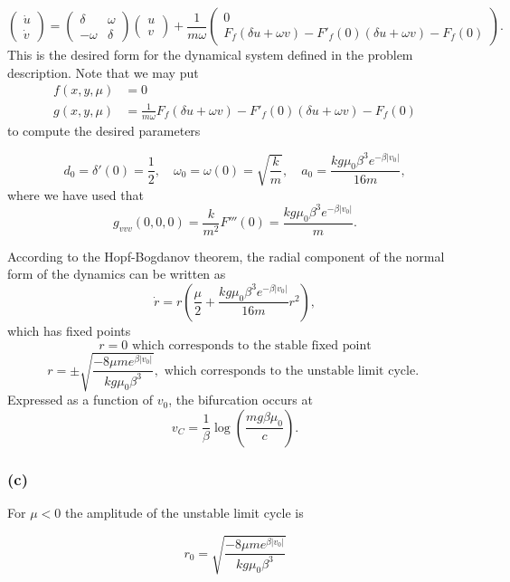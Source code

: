 \documentclass[twoside,10pt,a4paper]{article}
\begin{document}
 \begin{equation}
 \begin{pmatrix} \dot{u} \\ \dot{v} \end{pmatrix} = \begin{pmatrix} \delta  & \omega  \\  -\omega & \delta \end{pmatrix}\begin{pmatrix} u \\ v  \end{pmatrix} + \frac{1}{m\omega}\begin{pmatrix} 0  \\ F_f(\delta u + \omega v) - F'_f(0)(\delta u + \omega v) - F_f (0)\end{pmatrix}.
 \end{equation}
 This is the desired form for the dynamical system defined in the problem description. Note that we may put
 \begin{align*}
 f(x,y,\mu) &=0 \\
 g(x,y,\mu) &= \frac{1}{m\omega} F_f(\delta u + \omega v) - F'_f(0)(\delta u + \omega v) - F_f (0)
 \end{align*}
 to compute the desired parameters
 
$$
d_0 = \delta'(0)=\frac{1}{2}, \quad \omega_0 = \omega(0)= \sqrt{\frac{k}{m}}, \quad a_0 = \frac{kg\mu_0 \beta^3 e^{-\beta |v_0|}}{16m},
$$
where we have used that 
$$ 
g_{vvv}(0,0,0) = \frac{k}{m^2}F'''(0)= \frac{kg\mu_0 \beta^3 e^{-\beta |v_0|}}{m}.
$$

According to the Hopf-Bogdanov theorem, the radial component of the normal form of the dynamics can be written as
\begin{equation}
\boxed{\dot{r}=r\left( \frac{\mu}{2}+ \frac{kg\mu_0 \beta^3 e^{-\beta |v_0|}}{16m}r^2\right)},
\end{equation}
which has fixed points 
$$
r=0 \text{ which corresponds to the stable fixed point}
$$
$$
r = \pm \sqrt{\frac{-8\mu m e^{\beta |v_0|}}{kg\mu_0 \beta^3}}, \text{ which corresponds to the unstable limit cycle. }
$$
Expressed as a function of $v_0$, the bifurcation occurs at 
$$
v_C = \frac{1}{\beta}\log \left(\frac{mg\beta \mu_0}{c} \right).
$$

\subsubsection*{(c)} For $\mu<0$ the amplitude of the unstable limit cycle is 

$$
r_0 = \sqrt{\frac{-8\mu m e^{\beta |v_0|}}{kg\mu_0 \beta^3}}
$$
\end{document}
